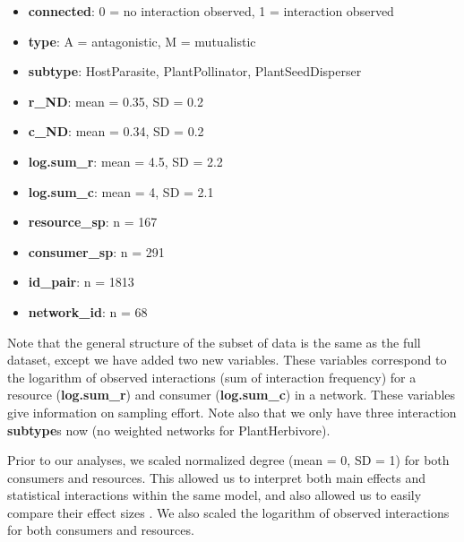 \documentclass[11pt,]{article}
\newenvironment{Shaded}{}{}
\newcommand{\KeywordTok}[1]{\textcolor[rgb]{0.00,0.00,1.00}{#1}}
\newcommand{\DataTypeTok}[1]{#1}
\newcommand{\StringTok}[1]{\textcolor[rgb]{0.00,0.50,0.50}{#1}}
\newcommand{\OperatorTok}[1]{#1}
\newcommand{\NormalTok}[1]{#1}
\providecommand{\tightlist}{%
  \setlength{\itemsep}{0pt}\setlength{\parskip}{0pt}}
\begin{document}
\begin{itemize}
\tightlist
\item
  \textbf{connected}: 0 = no interaction observed, 1 = interaction
  observed
\item
  \textbf{type}: A = antagonistic, M = mutualistic
\item
  \textbf{subtype}: HostParasite, PlantPollinator, PlantSeedDisperser
\item
  \textbf{r\_ND}: mean = 0.35, SD = 0.2
\item
  \textbf{c\_ND}: mean = 0.34, SD = 0.2
\item
  \textbf{log.sum\_r}: mean = 4.5, SD = 2.2
\item
  \textbf{log.sum\_c}: mean = 4, SD = 2.1
\item
  \textbf{resource\_sp}: n = 167
\item
  \textbf{consumer\_sp}: n = 291
\item
  \textbf{id\_pair}: n = 1813
\item
  \textbf{network\_id}: n = 68
\end{itemize}

Note that the general structure of the subset of data is the same as the
full dataset, except we have added two new variables. These variables
correspond to the logarithm of observed interactions (sum of interaction
frequency) for a resource (\textbf{log.sum\_r}) and consumer
(\textbf{log.sum\_c}) in a network. These variables give information on
sampling effort. Note also that we only have three interaction
\textbf{subtype}s now (no weighted networks for PlantHerbivore).

Prior to our analyses, we scaled normalized degree (mean = 0, SD = 1)
for both consumers and resources. This allowed us to interpret both main
effects and statistical interactions within the same model, and also
allowed us to easily compare their effect sizes \citep{Schielzeth2010}.
We also scaled the logarithm of observed interactions for both consumers
and resources.

\begin{Shaded}
\end{Shaded}
\end{document}
